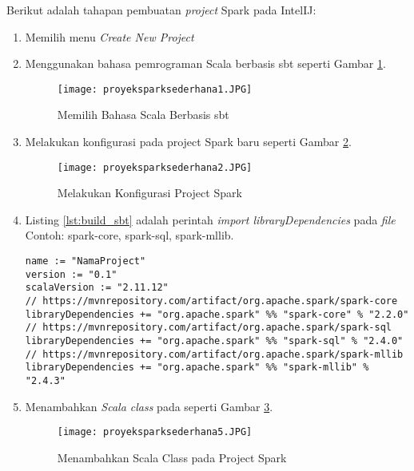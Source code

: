 \noindent Berikut adalah tahapan pembuatan \textit{project} Spark pada IntelIJ:

\begin{enumerate}
\item Memilih menu \textit{Create New Project}

\item Menggunakan bahasa pemrograman Scala berbasis sbt seperti Gambar \ref{fig:proyeksparksederhana1}.
\begin{figure}[H]
	\centering
	\texttt{[image: proyeksparksederhana1.JPG]}
	\caption{Memilih Bahasa Scala Berbasis sbt}
	\label{fig:proyeksparksederhana1}
\end{figure}

\item Melakukan konfigurasi pada project Spark baru seperti Gambar \ref{fig:proyeksparksederhana2}.
\begin{figure}[H]
	\centering
	\texttt{[image: proyeksparksederhana2.JPG]}
	\caption{Melakukan Konfigurasi Project Spark}
	\label{fig:proyeksparksederhana2}
\end{figure}

\item Listing \ref{lst:build_sbt} adalah perintah \textit{import libraryDependencies} pada \textit{file}  \\ 
Contoh: spark-core, spark-sql, spark-mllib.
\begin{lstlisting}[basicstyle=\ttfamily, frame=single,
	columns=fullflexible, keepspaces=true, breaklines=true, label=lst:build_sbt, caption=Melakukan Import Library Spark]
name := "NamaProject"
version := "0.1"
scalaVersion := "2.11.12"
// https://mvnrepository.com/artifact/org.apache.spark/spark-core
libraryDependencies += "org.apache.spark" %% "spark-core" % "2.2.0"
// https://mvnrepository.com/artifact/org.apache.spark/spark-sql
libraryDependencies += "org.apache.spark" %% "spark-sql" % "2.4.0"
// https://mvnrepository.com/artifact/org.apache.spark/spark-mllib
libraryDependencies += "org.apache.spark" %% "spark-mllib" % "2.4.3"

\end{lstlisting}

\item Menambahkan \textit{Scala class} pada  seperti Gambar \ref{fig:proyeksparksederhana5}.  
\begin{figure}[H]
	\centering
	\texttt{[image: proyeksparksederhana5.JPG]}
	\caption{Menambahkan Scala Class pada Project Spark}
	\label{fig:proyeksparksederhana5}
\end{figure}


\end{enumerate}
